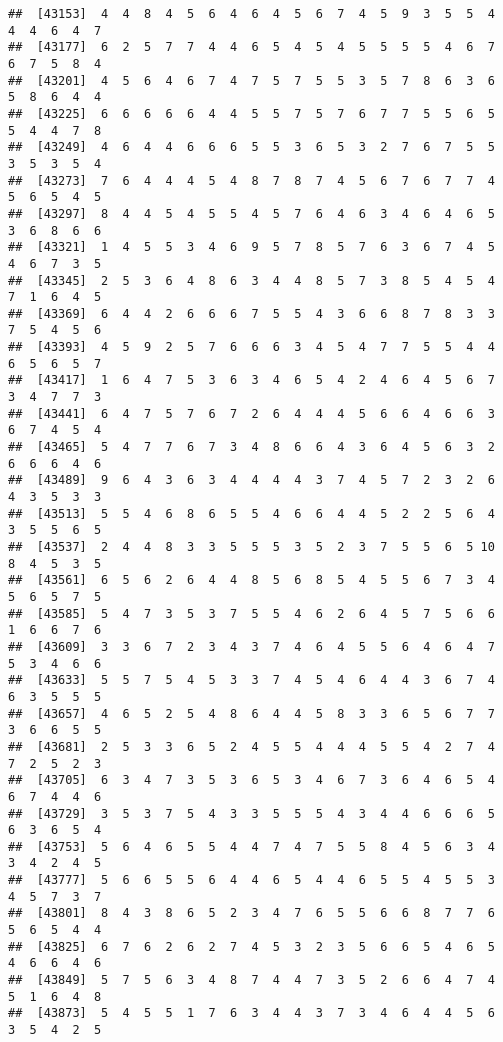 \documentclass[
]{book}
\begin{document}
\begin{verbatim}
##  [43153]  4  4  8  4  5  6  4  6  4  5  6  7  4  5  9  3  5  5  4  4  4  6  4  7
##  [43177]  6  2  5  7  7  4  4  6  5  4  5  4  5  5  5  5  4  6  7  6  7  5  8  4
##  [43201]  4  5  6  4  6  7  4  7  5  7  5  5  3  5  7  8  6  3  6  5  8  6  4  4
##  [43225]  6  6  6  6  6  4  4  5  5  7  5  7  6  7  7  5  5  6  5  5  4  4  7  8
##  [43249]  4  6  4  4  6  6  6  5  5  3  6  5  3  2  7  6  7  5  5  3  5  3  5  4
##  [43273]  7  6  4  4  4  5  4  8  7  8  7  4  5  6  7  6  7  7  4  5  6  5  4  5
##  [43297]  8  4  4  5  4  5  5  4  5  7  6  4  6  3  4  6  4  6  5  3  6  8  6  6
##  [43321]  1  4  5  5  3  4  6  9  5  7  8  5  7  6  3  6  7  4  5  4  6  7  3  5
##  [43345]  2  5  3  6  4  8  6  3  4  4  8  5  7  3  8  5  4  5  4  7  1  6  4  5
##  [43369]  6  4  4  2  6  6  6  7  5  5  4  3  6  6  8  7  8  3  3  7  5  4  5  6
##  [43393]  4  5  9  2  5  7  6  6  6  3  4  5  4  7  7  5  5  4  4  6  5  6  5  7
##  [43417]  1  6  4  7  5  3  6  3  4  6  5  4  2  4  6  4  5  6  7  3  4  7  7  3
##  [43441]  6  4  7  5  7  6  7  2  6  4  4  4  5  6  6  4  6  6  3  6  7  4  5  4
##  [43465]  5  4  7  7  6  7  3  4  8  6  6  4  3  6  4  5  6  3  2  6  6  6  4  6
##  [43489]  9  6  4  3  6  3  4  4  4  4  3  7  4  5  7  2  3  2  6  4  3  5  3  3
##  [43513]  5  5  4  6  8  6  5  5  4  6  6  4  4  5  2  2  5  6  4  3  5  5  6  5
##  [43537]  2  4  4  8  3  3  5  5  5  3  5  2  3  7  5  5  6  5 10  8  4  5  3  5
##  [43561]  6  5  6  2  6  4  4  8  5  6  8  5  4  5  5  6  7  3  4  5  6  5  7  5
##  [43585]  5  4  7  3  5  3  7  5  5  4  6  2  6  4  5  7  5  6  6  1  6  6  7  6
##  [43609]  3  3  6  7  2  3  4  3  7  4  6  4  5  5  6  4  6  4  7  5  3  4  6  6
##  [43633]  5  5  7  5  4  5  3  3  7  4  5  4  6  4  4  3  6  7  4  6  3  5  5  5
##  [43657]  4  6  5  2  5  4  8  6  4  4  5  8  3  3  6  5  6  7  7  3  6  6  5  5
##  [43681]  2  5  3  3  6  5  2  4  5  5  4  4  4  5  5  4  2  7  4  7  2  5  2  3
##  [43705]  6  3  4  7  3  5  3  6  5  3  4  6  7  3  6  4  6  5  4  6  7  4  4  6
##  [43729]  3  5  3  7  5  4  3  3  5  5  5  4  3  4  4  6  6  6  5  6  3  6  5  4
##  [43753]  5  6  4  6  5  5  4  4  7  4  7  5  5  8  4  5  6  3  4  3  4  2  4  5
##  [43777]  5  6  6  5  5  6  4  4  6  5  4  4  6  5  5  4  5  5  3  4  5  7  3  7
##  [43801]  8  4  3  8  6  5  2  3  4  7  6  5  5  6  6  8  7  7  6  5  6  5  4  4
##  [43825]  6  7  6  2  6  2  7  4  5  3  2  3  5  6  6  5  4  6  5  4  6  6  4  6
##  [43849]  5  7  5  6  3  4  8  7  4  4  7  3  5  2  6  6  4  7  4  5  1  6  4  8
##  [43873]  5  4  5  5  1  7  6  3  4  4  3  7  3  4  6  4  4  5  6  3  5  4  2  5

\end{verbatim}
\end{document}
